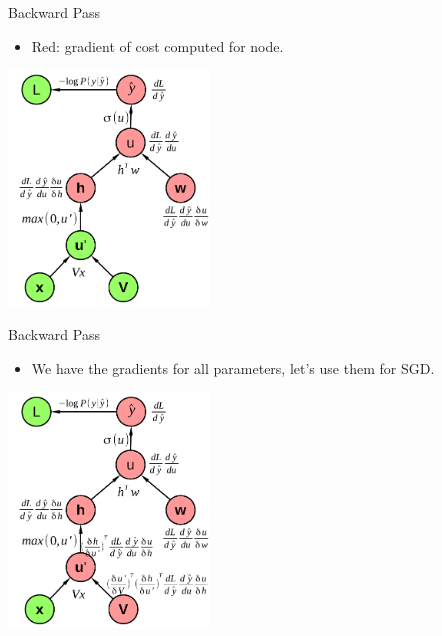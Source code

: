 
\begin{vbframe}{Backward Pass}

\vfill

\begin{itemize}
\item Red: gradient of cost computed for node.
\end{itemize}
\begin{center}
\includegraphics[width = 0.4\textwidth]{./figure/relu_sigmoid_graph_with_loss_backward3}
\end{center}

\vfill

\end{vbframe}



\begin{vbframe}{Backward Pass}

\vfill

\begin{itemize}
\item We have the gradients for all parameters, let's use them for SGD.
\end{itemize}
\begin{center}
\includegraphics[width = 0.4\textwidth]{./figure/relu_sigmoid_graph_with_loss_backward4}
\end{center}

\vfill

\end{vbframe}


\endlecture

